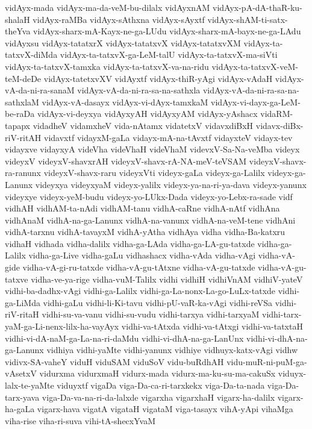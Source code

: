 {vidAyx-mada
vidAyx-ma-da-veM-bu-dilalx
vidAyxnAM
vidAyx-pA-dA-thaR-ku-shalaH
vidAyx-raMBa
vidAyx-sAthxna
vidAyx-sAyxtf
vidAyx-shAM-ti-satx-theYva
vidAyx-sharx-mA-Kayx-ne-ga-LUdu
vidAyx-sharx-mA-bayx-ne-ga-LAdu
vidAyxsu
vidAyx-tatatxrX
vidAyx-tatatxvX
vidAyx-tatatxvXM
vidAyx-ta-tatxvX-diMda
vidAyx-ta-tatxvX-ga-LeM-talU
vidAyx-ta-tatxvX-ma-siVti
vidAyx-ta-tatxvX-tamxka
vidAyx-ta-tatxvX-va-na-ridu
vidAyx-ta-tatxvX-veM-teM-deDe
vidAyx-tatetxvXV
vidAyxtf
vidAyx-thiR-yAgi
vidAyx-vAdaH
vidAyx-vA-da-ni-ra-sanaM
vidAyx-vA-da-ni-ra-sa-na-sathxla
vidAyx-vA-da-ni-ra-sa-na-sathxlaM
vidAyx-vA-dasayx
vidAyx-vi-dAyx-tamxkaM
vidAyx-vi-dayx-ga-LeM-be-raDa
vidAyx-vi-deyxya
vidAyxyAH
vidAyxyAM
vidAyx-yAshacx
vidaRM-tapapx
vidadheV
vidamxheV
vida-nAtamx
vidatetxV
vidavxdiBxH
vidavx-diBx-riV-ritAH
vidavxtf
vidayxM-gaLa
vidayx-mA-na-tAvxtf
vidayxteV
vidayx-tev
vidayxve
vidayxyA
videVha
videVhaH
videVhaM
videvxV-Sa-Na-veMba
videyx
videyxV
videyxV-shavxrAH
videyxV-shavx-rA-NA-meV-teVSAM
videyxV-shavx-ra-ranunx
videyxV-shavx-raru
videyxVti
videyx-gaLa
videyx-ga-Lalilx
videyx-ga-Lanunx
videyxya
videyxyaM
videyx-yalilx
videyx-ya-na-ri-ya-dava
videyx-yanunx
videyxye
videyx-yeM-budu
videyx-yo-LUkx-Dada
videyx-yo-Lebx-ra-sade
vidf
vidhAH
vidhAM-ta-nAdi
vidhAM-tanu
vidhA-caRne
vidhA-nAtf
vidhAna
vidhAnaM
vidhA-na-ga-Lanunx
vidhA-na-vanunx
vidhA-na-veM-tene
vidhAni
vidhA-tarxnu
vidhA-tavayxM
vidhA-yAtha
vidhAya
vidha
vidha-Ba-katxru
vidhaH
vidhada
vidha-dalilx
vidha-ga-LAda
vidha-ga-LA-gu-tatxde
vidha-ga-Lalilx
vidha-ga-Live
vidha-gaLu
vidhashacx
vidha-vAda
vidha-vAgi
vidha-vA-gide
vidha-vA-gi-ru-tatxde
vidha-vA-gu-tAtxne
vidha-vA-gu-tatxde
vidha-vA-gu-tatxve
vidha-ve-ya-rige
vidha-vuM-Talilx
vidhi
vidhiH
vidhiVnAM
vidhiV-yateV
vidhi-ba-dadhx-vAgi
vidhi-ga-Lalilx
vidhi-ga-La-nonx-La-go-LuLx-tatxde
vidhi-ga-LiMda
vidhi-gaLu
vidhi-li-Ki-tavu
vidhi-pU-vaR-ka-vAgi
vidhi-reVSa
vidhi-riV-ritaH
vidhi-su-va-vanu
vidhi-su-vudu
vidhi-tarxya
vidhi-tarxyaM
vidhi-tarx-yaM-ga-Li-nenx-lilx-ha-vayAyx
vidhi-va-tAtxda
vidhi-va-tAtxgi
vidhi-va-tatxtaH
vidhi-vi-dA-naM-ga-La-na-ri-daMdu
vidhi-vi-dhA-na-ga-LanUnx
vidhi-vi-dhA-na-ga-Lanunx
vidhiya
vidhi-yaMte
vidhi-yanunx
vidhiye
vidhuyx-katx-vAgi
vidhw
vidivx-SA-vaheY
viduH
viduSAM
viduSoV
vidu-buRdhAH
vidu-muR-ni-puM-ga-vAsetxV
vidurxma
vidurxmaH
vidurx-mada
vidurx-ma-ku-su-ma-cakuSx
viduyx-lalx-te-yaMte
viduyxtf
vigaDa
viga-Da-ca-ri-tarxkekx
viga-Da-ta-nada
viga-Da-tarx-yava
viga-Da-va-na-ri-da-lalxde
vigarxha
vigarxhaH
vigarx-ha-dalilx
vigarx-ha-gaLa
vigarx-hava
vigatA
vigataH
vigataM
viga-tasayx
vihA-yApi
vihaMga
viha-rise
viha-ri-suva
vihi-tA-shecxYvaM
}
